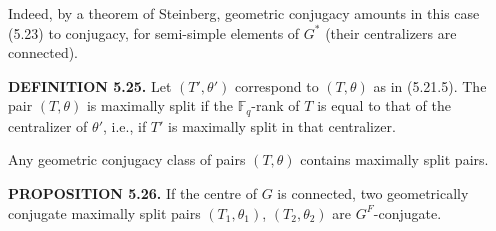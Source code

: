 \documentclass[9pt,twoside]{extarticle}
\begin{document}
{Indeed, by a theorem of Steinberg, geometric conjugacy amounts in this case (5.23) to conjugacy, for semi-simple elements of \(G^*\) (their centralizers are connected).\par

\noindent\textbf{DEFINITION 5.25.} Let \((T',\theta')\) correspond to \((T,\theta)\) as in (5.21.5). The pair \((T,\theta)\) is maximally split if the \(\mathbb F_q\)-rank of \(T\) is equal to that of the centralizer of \(\theta'\), i.e., if \(T'\) is maximally split in that centralizer.\par

Any geometric conjugacy class of pairs \((T,\theta)\) contains maximally split pairs.\par

\noindent\textbf{PROPOSITION 5.26.} If the centre of \(G\) is connected, two geometrically conjugate maximally split pairs \((T_1,\theta_1)\), \((T_2,\theta_2)\) are \(G^F\)-conjugate.\par
}
\end{document}
